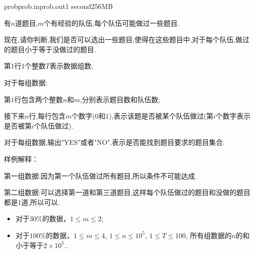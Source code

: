 \documentclass[11pt,a4paper,oneside]{article}
\begin{document}
\begin{problem}{prob}{prob.in}{prob.out}{1 second}{256MB}

	有$n$道题目,$m$个有经验的队伍,每个队伍可能做过一些题目.
	
	现在,请你判断,我们是否可以选出一些题目,使得在这些题目中,对于每个队伍,做过的题目小于等于没做过的题目.

    \InputFile

	第$1$行$1$个整数$T$表示数据组数;
	
	对于每组数据:
	
	第$1$行包含两个整数$n$和$m$,分别表示题目数和队伍数;
	
	接下来$n$行,每行包含$m$个数字($0$和$1$),表示该题是否被某个队伍做过(第$i$个数字表示是否被第$i$个队伍做过).

    \OutputFile

	对于每组数据,输出"YES"或者"NO",表示是否能找到题目要求的题目集合.

    \Example

    \begin{example}
	\end{example}

	样例解释：
	
	第一组数据:因为第一个队伍做过所有题目,所以条件不可能达成.
	
	第二组数据:可以选择第一道和第三道题目,这样每个队伍做过的题目和没做的题目都是$1$道,所以可以.

    \Note
    
    \begin{itemize}
		\item 对于$30\%$的数据，$1 \leq m \leq 2$;
		\item 对于$100\%$的数据，$1 \leq m \leq 4$, $1 \leq n \leq 10^5$, $1 \leq T \leq 100$, 所有组数据的$n$的和小于等于$2 \times 10^5$..
    \end{itemize}

\end{problem}
\end{document}
